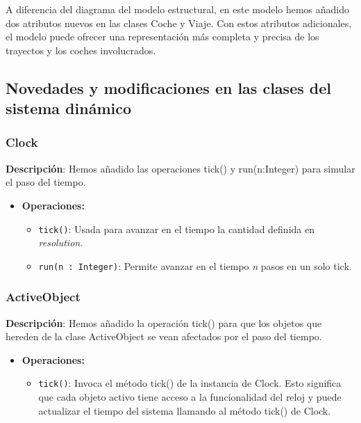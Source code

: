 \documentclass[12pt.a4paper]{article}
\begin{document}
A diferencia del diagrama del modelo estructural, en este modelo hemos añadido dos atributos nuevos en las clases Coche y Viaje. Con estos atributos adicionales, el modelo puede ofrecer una representación más completa y precisa de los trayectos y los coches involucrados.

\subsection{Novedades y modificaciones en las clases del sistema dinámico}
\subsubsection{Clock}
\textbf{Descripción}:  Hemos añadido las operaciones tick() y run(n:Integer) para simular el paso del tiempo.
\begin{itemize}
    \item \textbf{Operaciones:}
    \begin{itemize}
        \item \texttt{tick()}: Usada para avanzar en el tiempo la cantidad definida en \emph{resolution}.
        \item \texttt{run(n : Integer)}: Permite avanzar en el tiempo \emph{n} pasos en un solo tick.
    \end{itemize}
\end{itemize}
    
\subsubsection{ActiveObject}
\textbf{Descripción}:  Hemos añadido la operación tick() para que los objetos que hereden de la clase ActiveObject se vean afectados por el paso del tiempo.
\begin{itemize}
    \item \textbf{Operaciones:}
    \begin{itemize}
        \item \texttt{tick()}: Invoca el método tick() de la instancia de Clock. Esto significa que cada objeto activo tiene acceso a la funcionalidad del reloj y puede actualizar el tiempo del sistema llamando al método tick() de Clock.
    \end{itemize}
\end{itemize}
\end{document}
